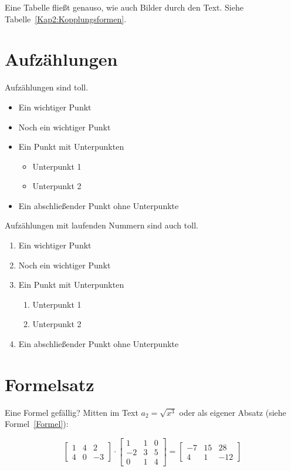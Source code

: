 Eine Tabelle fließt genauso, wie auch Bilder durch den Text. Siehe Tabelle~\ref{Kap2:Kopplungsformen}.

\blindtext[1]


\section{Aufzählungen}

Aufzählungen sind toll.

\begin{itemize}
  \item Ein wichtiger Punkt
  \item Noch ein wichtiger Punkt
  \item Ein Punkt mit Unterpunkten
    \begin{itemize}
      \item Unterpunkt 1
      \item Unterpunkt 2      
    \end{itemize}
  \item Ein abschließender Punkt ohne Unterpunkte
\end{itemize}


Aufzählungen mit laufenden Nummern sind auch toll.

\begin{enumerate}
  \item Ein wichtiger Punkt
  \item Noch ein wichtiger Punkt
  \item Ein Punkt mit Unterpunkten
    \begin{enumerate}
      \item Unterpunkt 1
      \item Unterpunkt 2      
    \end{enumerate}
  \item Ein abschließender Punkt ohne Unterpunkte
\end{enumerate}

\blindtext[1]


\section{Formelsatz}

Eine Formel gefällig? Mitten im Text $a_2 = \sqrt{x^3}$ oder als eigener Absatz (siehe Formel~\ref{Formel}):

\begin{equation}
\begin{bmatrix}         
   1 &  4 &  2 \\
   4 &  0 & -3 
\end{bmatrix}        
        \cdot
\begin{bmatrix}                
   1 &  1 &  0 \\
  -2 &  3 &  5 \\
   0 &  1 &  4 
\end{bmatrix}        
       {=} 
\begin{bmatrix}               
  -7 &  15 &  28 \\
   4 &   1 & -12 
\end{bmatrix}
\label{Formel}
\end{equation}


